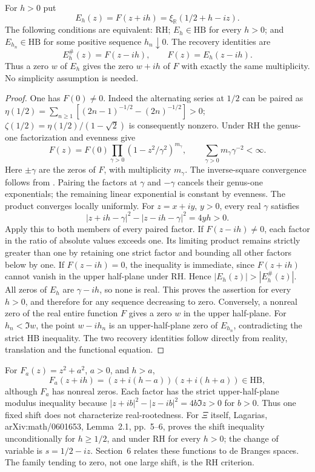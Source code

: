 \begin{theorem}
\label{v4-arith:w5-direct:thm:dB-form}
For $h>0$ put
\[
 E_h(z)=F(z+ih)=\xi_{\mathbb R}(1/2+h-iz).
\]
The following conditions are equivalent: RH; $E_h\in\mathrm{HB}$
for every $h>0$; and $E_{h_n}\in\mathrm{HB}$ for some positive
sequence $h_n\downarrow0$. The recovery identities are
\[
 E_h^\#(z)=F(z-ih),\qquad F(z)=E_h(z-ih).
\]
Thus a zero $w$ of $E_h$ gives the zero $w+ih$ of $F$ with exactly
the same multiplicity. No simplicity assumption is needed.
\end{theorem}
\begin{proof}
One has $F(0)\ne0$. Indeed the alternating series at $1/2$ can be
paired as
$\eta(1/2)=\sum_{n\ge1}[(2n-1)^{-1/2}-(2n)^{-1/2}]>0$;
$\zeta(1/2)=\eta(1/2)/(1-\sqrt2)$ is consequently nonzero.
Under RH the genus-one factorization and evenness give
\[
 F(z)=F(0)\prod_{\gamma>0}
       (1-z^2/\gamma^2)^{m_\gamma},\qquad
 \sum_{\gamma>0}m_\gamma\gamma^{-2}<\infty.
\]
Here $\pm\gamma$ are the zeros of $F$, with multiplicity
$m_\gamma$. The inverse-square convergence follows from
. Pairing the factors at $\gamma$ and
$-\gamma$ cancels their genus-one exponentials; the remaining linear
exponential is constant by evenness. The product converges locally
uniformly.
For $z=x+iy$, $y>0$, every real $\gamma$ satisfies
\[
 |z+ih-\gamma|^2-|z-ih-\gamma|^2=4yh>0.
\]
Apply this to both members of every paired factor. If
$F(z-ih)\ne0$, each factor in the ratio of absolute values exceeds
one. Its limiting product remains strictly greater than one by
retaining one strict factor and bounding all other factors below by
one. If $F(z-ih)=0$, the inequality is immediate, since $F(z+ih)$
cannot vanish in the upper half-plane under RH.
Hence $|E_h(z)|>|E_h^\#(z)|$.
All zeros of $E_h$ are $\gamma-ih$, so none is real.
This proves the assertion for every $h>0$, and therefore for any
sequence decreasing to zero.
Conversely, a nonreal zero of the real entire function $F$ gives a
zero $w$ in the upper half-plane. For $h_n<\Im w$, the point
$w-ih_n$ is an upper-half-plane zero of $E_{h_n}$, contradicting the
strict HB inequality. The two recovery identities follow directly
from reality, translation and the functional equation.
\end{proof}

\begin{remark}
\label{v4-arith:consumer53:fixed-shift}
For $F_a(z)=z^2+a^2$, $a>0$, and $h>a$,
\[
 F_a(z+ih)=(z+i(h-a))(z+i(h+a))\in\mathrm{HB},
\]
although $F_a$ has nonreal zeros. Each factor has the strict
upper-half-plane modulus inequality because
$|z+ib|^2-|z-ib|^2=4b\Im z>0$ for $b>0$.
Thus one fixed shift does not characterize real-rootedness.
For $\Xi$ itself, Lagarias, arXiv:math/0601653, Lemma~2.1,
pp.~5--6, proves the shift inequality unconditionally for
$h\ge1/2$, and under RH for every $h>0$; the change of variable is
$s=1/2-iz$. Section~6 relates these functions to de Branges spaces.
The family tending to zero, not one large shift, is the RH criterion.
\end{remark}


